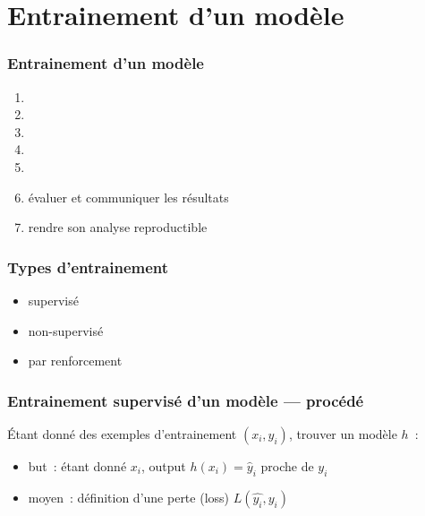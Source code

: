 \documentclass{formation}
\begin{document}
\section{Entrainement d'un modèle}

\begin{frame}
  \frametitle{Entrainement d'un modèle}

  \begin{enumerate}
  \item {}
  \item {}
  \item {}
  \item {}
  \item {}
  \item évaluer et communiquer les résultats
  \item rendre son analyse reproductible
  \end{enumerate}
\end{frame}

\begin{frame}
  \frametitle{Types d'entrainement}
  \begin{itemize}[<+->]
  \item supervisé
  \item non-supervisé
  \item par renforcement
  \end{itemize}
\end{frame}

\begin{frame}
  \frametitle{Entrainement supervisé d'un modèle — procédé}
  Étant donné des exemples d'entrainement $(x_i, y_i)$, trouver un
  modèle $h$ :
  \begin{itemize}[<+->]
  \item but : étant donné $x_i$, output $h(x_i) = \hat{y}_i$ proche de
    $y_i$
  \item moyen : définition d'une perte (loss) $L(\hat{y_i}, y_i)$ \\[.2cm]
    \\[.2cm]
    \\[.2cm]
  \end{itemize}
\end{frame}
\end{document}
